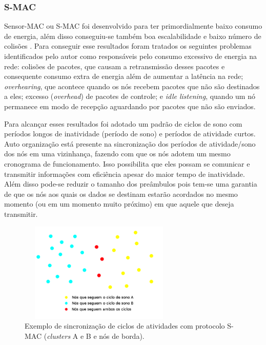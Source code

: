  \subsubsection{S-MAC}
 \label{sec:smac}
 
Sensor-MAC ou S-MAC foi desenvolvido para ter primordialmente baixo consumo de energia, além disso conseguiu-se também boa escalabilidade e baixo número de colisões \cite{ye04}. Para conseguir esse resultados foram tratados os seguintes problemas identificados pelo autor como responsáveis pelo consumo excessivo de energia na rede: colisões de pacotes, que causam a retransmissão desses pacotes e consequente consumo extra de energia além de aumentar a latência na rede; \textit{overhearing}, que acontece quando os nós recebem pacotes que não são destinados a eles; excesso (\textit{overhead}) de pacotes de controle; e \textit{idle listening}, quando um nó permanece em modo de recepção aguardando por pacotes que não são enviados.

Para alcançar esses resultados foi adotado um padrão de ciclos de sono com períodos longos de inatividade (período de sono) e períodos de atividade curtos. Auto organização está presente na sincronização dos períodos de atividade/sono dos nós em uma vizinhança, fazendo com que os nós adotem um mesmo cronograma de funcionamento. Isso possibilita que eles possam se comunicar e transmitir informações com eficiência apesar do maior tempo de inatividade. Além disso pode-se reduzir o tamanho dos preâmbulos pois tem-se uma garantia de que os nós aos quais os dados se destinam estarão acordados no mesmo momento (ou em um momento muito próximo) em que aquele que deseja transmitir.

\begin{figure}[!htb]
\centering
\includegraphics[width=290px,height=180px]{./Pictures/S-MACSynchronization.png}
\caption{Exemplo de sincronização de ciclos de atividades com protocolo S-MAC (\emph{clusters} A e B e nós de borda).} %
\label{fig:SmacSynch} %
\end{figure}
 
